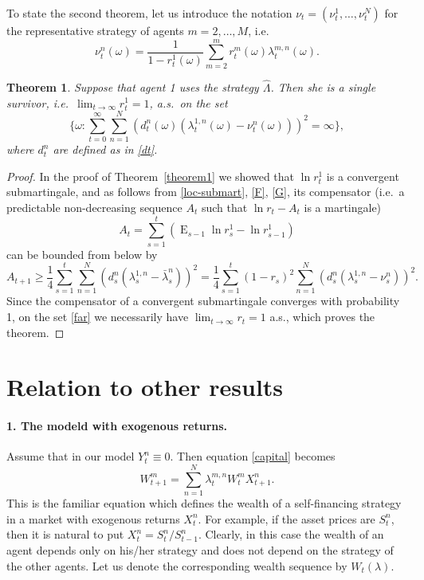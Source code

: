 \documentclass[a4paper,11pt,english]{article}
\newtheorem{theorem}{Theorem}
\theoremstyle{definition}
\DeclareMathOperator{\E}{E}
\renewcommand{\hat}{\widehat}
\begin{document}
To state the second theorem, let us introduce the notation
$\nu_t=(\nu_t^1,\ldots,\nu_t^N)$ for the representative strategy of agents
$m=2,\ldots,M$, i.e.
\[
\nu_t^n(\omega) = \frac{1}{1-r_t^1(\omega)}\sum_{m=2}^m r_t^m(\omega) \lambda_t^{m,n}(\omega).
\]
\begin{theorem}
\label{theorem2} Suppose that agent 1 uses the strategy $\hat\Lambda$. Then
she is a single survivor, i.e.\ $\lim_{t\to\infty} r_t^1 = 1$, a.s.\ on the
set
\begin{equation}
\biggl\{\omega : \sum_{t=0}^\infty\sum_{n=1}^N (d_t^n(\omega)(\lambda_t^{1,n}(\omega) -
\nu_t^n(\omega)))^2 = \infty\biggr\},\label{far}
\end{equation}
where $d_t^n$ are defined as in \eqref{dt}.
\end{theorem}
\begin{proof}
In the proof of Theorem~\ref{theorem1} we showed that $\ln r_t^1$ is a convergent
submartingale, and as follows from \eqref{loc-submart}, \eqref{F},
\eqref{G}, its compensator (i.e.\ a predictable non-decreasing sequence $A_t$
such that $\ln r_t - A_t$ is a martingale)
\[
A_t = \sum_{s=1}^t (\E_{s-1}\ln r_{s}^1 - \ln r_{s-1}^1)
\]
can be bounded
from below by
\[
A_{t+1} \ge \frac14\sum_{s=1}^t \sum_{n=1}^N (d_s^n(\lambda_s^{1,n} - \bar \lambda_s^n))^2 =
\frac14\sum_{s=1}^t (1-r_s)^2 \sum_{n=1}^N (d_s^n(\lambda_s^{1,n} - \nu_s^n))^2.
\]
Since the compensator of a convergent submartingale converges with
probability 1, on the set
\eqref{far} we necessarily have $\lim_{t\to\infty} r_t = 1$ a.s., which proves the theorem.
\end{proof}


\section{Relation to other results}
\paragraph{1. The modeld with exogenous returns.} Assume that in our model $Y_t^n \equiv 0$. Then equation \eqref{capital} becomes
\[
W_{t+1}^m = \sum_{n=1}^N \lambda_t^{m,n} W_t^m X_{t+1}^n.
\]
This is the familiar equation which defines the wealth of a self-financing strategy in a market with exogenous returns $X_t^n$. For example, if the asset prices are $S_t^n$, then it is natural to put $X_{t}^n = S_{t}^n/S_{t-1}^n$. Clearly, in this case the wealth of an agent depends only on his/her strategy and does not depend on the strategy of the other agents. Let us denote the corresponding wealth sequence by $W_t(\lambda)$.
\end{document}
